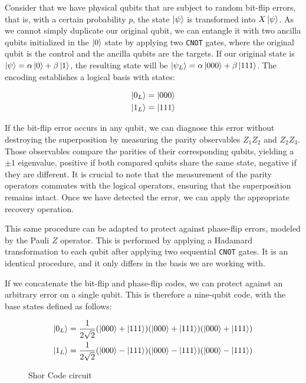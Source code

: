 \documentclass[12pt, twoside, openany]{book}
\begin{document}
Consider that we have physical qubits that are subject to random bit-flip errors, that is, with a certain probability $p$, the state $\ket{ \psi }$ is transformed into $X \ket{ \psi }$. As we cannot simply duplicate our original qubit, we can entangle it with two ancilla qubits initialized in the $\ket{0}$ state by applying two \texttt{CNOT} gates, where the original qubit is the control and the ancilla qubits are the targets. If our original state is $\ket{ \psi } = \alpha \ket{0} + \beta \ket{1}$, the resulting state will be $\ket{ \psi_L } = \alpha \ket{000} + \beta \ket{111}$. The encoding establishes a logical basis with states: 

\begin{align*}
    \ket{0_L} = \ket{000} \\
    \ket{1_L} = \ket{111}
\end{align*}

If the bit-flip error occurs in any qubit, we can diagnose this error without destroying the superposition by measuring the parity observables $Z_1 Z_2$ and $Z_2 Z_3$. Those observables compare the parities of their corresponding qubits, yielding a $\pm 1$ eigenvalue, positive if both compared qubits share the same state, negative if they are different. It is crucial to note that the measurement of the parity operators commutes with the logical operators, ensuring that the superposition remains intact. Once we have detected the error, we can apply the appropriate recovery operation. 

This same procedure can be adapted to protect against phase-flip errors, modeled by the Pauli $Z$ operator. This is performed by applying a Hadamard transformation to each qubit after applying two sequential \texttt{CNOT} gates. It is an identical procedure, and it only differs in the basis we are working with. 

If we concatenate the bit-flip and phase-flip codes, we can protect against an arbitrary error on a single qubit. This is therefore a nine-qubit code, with the base states defined as follows:

\begin{align*}
    \ket{0_L} = \frac{1}{2 \sqrt{2}} (\ket{000} + \ket{111}) (\ket{000} + \ket{111}) (\ket{000} + \ket{111}) \\
    \ket{1_L} = \frac{1}{2 \sqrt{2}} (\ket{000} - \ket{111}) (\ket{000} - \ket{111}) (\ket{000} - \ket{111})
\end{align*}

\begin{figure}[h]
\centering

\caption{Shor Code circuit}
\end{figure}
\end{document}
